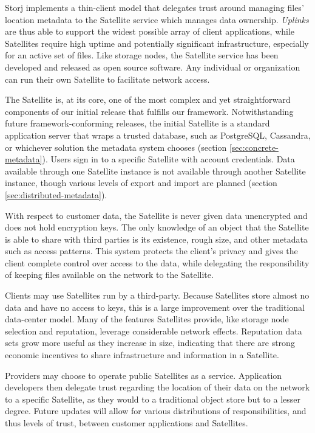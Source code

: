 \documentclass[8pt,fleqn,openany]{book}
\begin{document}
Storj implements a thin-client model that delegates trust around managing
files' location metadata to the Satellite service which manages data
ownership. {\em Uplinks}
are thus able to support the widest possible array of client applications, while
Satellites require high uptime and potentially significant infrastructure,
especially for an active set of files.
Like storage nodes,
the Satellite service has been developed and released as open source software.
Any individual or organization can run their own Satellite to facilitate
network access.

The Satellite is, at its core, one of the most complex and yet
straightforward components of our initial release that fulfills our framework.
Notwithstanding future framework-conforming releases, the initial Satellite
is a standard application server that wraps a trusted database, such as
PostgreSQL, Cassandra, or whichever solution the metadata system chooses
(section \ref{sec:concrete-metadata}). Users sign in to a specific
Satellite with account credentials.
Data available through one Satellite instance is
not available through another Satellite instance, though various levels of
export and import are planned (section \ref{sec:distributed-metadata}).

With respect to customer data, the Satellite is
never given data unencrypted and does not hold encryption keys.
The only knowledge of an object that the Satellite is able to share with
third parties is its existence, rough size, and other metadata such as access
patterns.
This system protects the client's privacy and gives the client complete
control over access to the data,
while delegating the responsibility of keeping files available on the network
to the Satellite.

Clients may use Satellites run by a third-party. Because Satellites store almost no
data and have no access to keys, this is a large improvement over the
traditional data-center model. Many of the features Satellites provide, like
storage node selection and reputation, leverage considerable network effects.
Reputation data sets grow more useful as they increase in size,
indicating that there are strong economic incentives to share infrastructure
and information in a Satellite.

Providers may choose to operate public Satellites as a service.
Application developers then delegate trust regarding the location of their
data on the network to a specific Satellite, as they
would to a traditional object store but to a lesser degree. Future updates
will allow for various distributions of responsibilities, and thus levels of
trust, between customer applications and Satellites.
\end{document}
